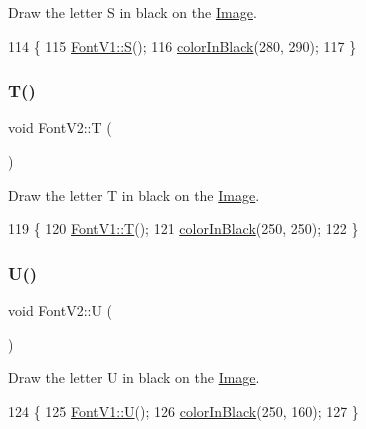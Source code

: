 Draw the letter S in black on the \mbox{\hyperlink{class_image}{Image}}. 


\begin{DoxyCode}
114                \{
115     \mbox{\hyperlink{class_font_v1_ab6daa08377051d5af458003c665cfc09}{FontV1::S}}();
116     \mbox{\hyperlink{class_font_v2_a04f2501961bc286ce70fbb6a840b0e8a}{colorInBlack}}(280, 290);
117 \}
\end{DoxyCode}
\mbox{\label{class_font_v2_a0311eabb37bc231b9b0c0a13cdc0e562}} 
\subsubsection{\texorpdfstring{T()}{T()}}
{\footnotesize\ttfamily void Font\+V2\+::T (\begin{DoxyParamCaption}{ }\end{DoxyParamCaption})}



Draw the letter T in black on the \mbox{\hyperlink{class_image}{Image}}. 


\begin{DoxyCode}
119                \{
120     \mbox{\hyperlink{class_font_v1_ab520e2522e89b6ff20e42621080edd7d}{FontV1::T}}();
121     \mbox{\hyperlink{class_font_v2_a04f2501961bc286ce70fbb6a840b0e8a}{colorInBlack}}(250, 250);
122 \}
\end{DoxyCode}
\mbox{\label{class_font_v2_a893e649c0fccfae9d99322fe5e333369}} 
\subsubsection{\texorpdfstring{U()}{U()}}
{\footnotesize\ttfamily void Font\+V2\+::U (\begin{DoxyParamCaption}{ }\end{DoxyParamCaption})}



Draw the letter U in black on the \mbox{\hyperlink{class_image}{Image}}. 


\begin{DoxyCode}
124                \{
125     \mbox{\hyperlink{class_font_v1_a460d625b76b123ba4e67a21091d7dcce}{FontV1::U}}();
126     \mbox{\hyperlink{class_font_v2_a04f2501961bc286ce70fbb6a840b0e8a}{colorInBlack}}(250, 160);
127 \}
\end{DoxyCode}
\mbox{\label{class_font_v2_a58980cf432ef60e1a765b1033da310b4}} 

